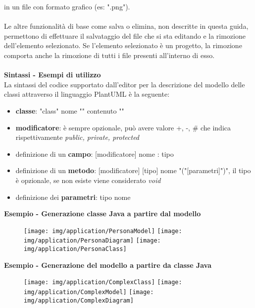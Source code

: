 \documentclass{article}
\begin{document}
\begin{appendices}
    in un file con formato grafico (es: ".png").\\
    \\Le altre funzionalità di base come salva o elimina, non descritte in questa guida, permettono di effettuare il salvataggio del file che si sta editando
    e la rimozione dell'elemento selezionato. Se l'elemento selezionato è un progetto, la rimozione comporta anche la rimozione di tutti i file presenti
    all'interno di esso.\\
    {\large \textbf{\\Sintassi - Esempi di utilizzo\\}}
    La sintassi del codice supportato dall'editor per la descrizione del modello delle classi attraverso il linguaggio PlantUML è la seguente:
    \begin{itemize}
      \item \textbf{classe}: "class" nome "{" contenuto "}"
      \item \textbf{modificatore}: è sempre opzionale, può avere valore +, -, \# che indica rispettivamente \textit{public, private, protected}
      \item definizione di un \textbf{campo}: [modificatore] nome : tipo
      \item definizione di un \textbf{metodo}: [modificatore] [tipo] nome "("[parametri]")", il tipo è opzionale, se non esiste viene considerato \textit{void}
      \item definizione dei \textbf{parametri}: tipo nome
    \end{itemize}
    \textbf{Esempio - Generazione classe Java a partire dal modello}
    \begin{figure}[H]
      \centering
      \begin{framed}
        \texttt{[image: img/application/PersonaModel]}
        \texttt{[image: img/application/PersonaDiagram]}
        \texttt{[image: img/application/PersonaClass]}
      \end{framed}
    \end{figure}
    \clearpage
    \textbf{Esempio - Generazione del modello a partire da classe Java}
    \begin{figure}[H]
      \centering
      \begin{framed}
        \texttt{[image: img/application/ComplexClass]}
        \texttt{[image: img/application/ComplexModel]}
        \texttt{[image: img/application/ComplexDiagram]}
      \end{framed}
    \end{figure}
  \end{appendices}
\end{document}
